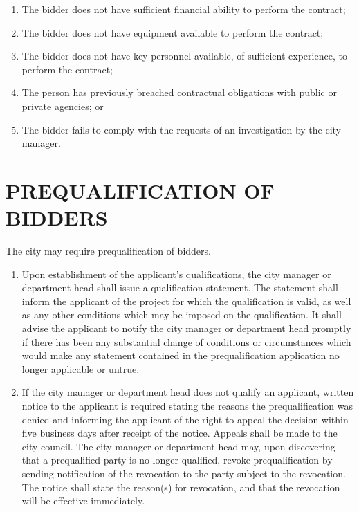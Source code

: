 \begin{enumerate}
	\item The bidder does not have sufficient financial ability to perform the contract; 
	\item The bidder does not have equipment available to perform the contract; 
	\item The bidder does not have key personnel available, of sufficient experience, to perform the contract; 
	\item The person has previously breached contractual obligations with public or private agencies; or 
	\item The bidder fails to comply with the requests of an investigation by the city manager. 
\end{enumerate}

\pagebreak

\section{PREQUALIFICATION OF BIDDERS}
The city may require prequalification of bidders. 

\begin{enumerate}
	\item Upon establishment of the applicant’s qualifications, the city manager or department head shall issue a qualification statement. The statement shall inform the applicant of the project for which the qualification is valid, as well as any other conditions which may be imposed on the qualification. It shall advise the applicant to notify the city manager or department head promptly if there has been any substantial change of conditions or circumstances which would make any statement contained in the prequalification application no longer applicable or untrue. 
	\item If the city manager or department head does not qualify an applicant, written notice to the applicant is required stating the reasons the prequalification was denied and informing the applicant of the right to appeal the decision within five business days after receipt of the notice. Appeals shall be made to the city council. The city manager or department head may, upon discovering that a prequalified party is no longer qualified, revoke prequalification by sending notification of the revocation to the party subject to the revocation. The notice shall state the reason(s) for revocation, and that the revocation will be effective immediately. 
\end{enumerate}

